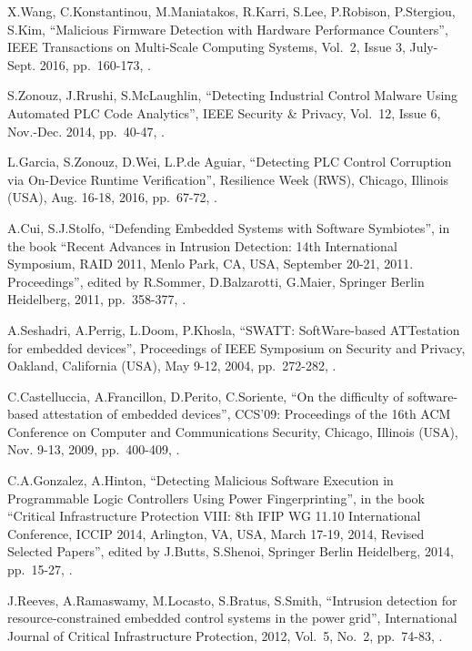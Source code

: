 \begin{thebibliography}{99}
X.Wang, C.Konstantinou, M.Maniatakos, R.Karri, S.Lee, P.Robison, P.Stergiou, S.Kim,
``Malicious Firmware Detection with Hardware Performance Counters'',
IEEE Transactions on Multi-Scale Computing Systems,
Vol.\ 2, Issue 3,
July-Sept. 2016,
pp.\ 160-173,
.

S.Zonouz, J.Rrushi, S.McLaughlin,
``Detecting Industrial Control Malware Using Automated PLC Code Analytics'',
IEEE Security \& Privacy,
Vol.\ 12, Issue 6,
Nov.-Dec. 2014,
pp.\ 40-47,
.

L.Garcia, S.Zonouz, D.Wei, L.P.de Aguiar,
``Detecting PLC Control Corruption via On-Device Runtime Verification'',
Resilience Week (RWS),
Chicago, Illinois (USA), Aug. 16-18, 2016,
pp.\ 67-72,
.

A.Cui, S.J.Stolfo,
``Defending Embedded Systems with Software Symbiotes'',
in the book ``Recent Advances in Intrusion Detection: 14th International Symposium, RAID 2011, Menlo Park, CA, USA, September 20-21, 2011. Proceedings'',
edited by R.Sommer, D.Balzarotti, G.Maier,
Springer Berlin Heidelberg, 2011,
pp.\ 358-377,
.

A.Seshadri, A.Perrig, L.Doom, P.Khosla,
``SWATT: SoftWare-based ATTestation for embedded devices'',
Proceedings of IEEE Symposium on Security and Privacy,
Oakland, California (USA), May 9-12, 2004,
pp.\ 272-282,
.

C.Castelluccia, A.Francillon, D.Perito, C.Soriente,
``On the difficulty of software-based attestation of embedded devices'',
CCS'09: Proceedings of the 16th ACM Conference on Computer and Communications Security,
Chicago, Illinois (USA), Nov. 9-13, 2009,
pp.\ 400-409,
.

C.A.Gonzalez, A.Hinton,
``Detecting Malicious Software Execution in Programmable Logic Controllers Using Power Fingerprinting'',
in the book ``Critical Infrastructure Protection VIII: 8th IFIP WG 11.10 International Conference, ICCIP 2014, Arlington, VA, USA, March 17-19, 2014, Revised Selected Papers'',
edited by J.Butts, S.Shenoi,
Springer Berlin Heidelberg, 2014,
pp.\ 15-27,
.

J.Reeves, A.Ramaswamy, M.Locasto, S.Bratus, S.Smith,
``Intrusion detection for resource-constrained embedded control systems in the power grid'',
International Journal of Critical Infrastructure Protection, 2012,
Vol.\ 5, No.\ 2,
pp.\ 74-83,
.


\end{thebibliography}

